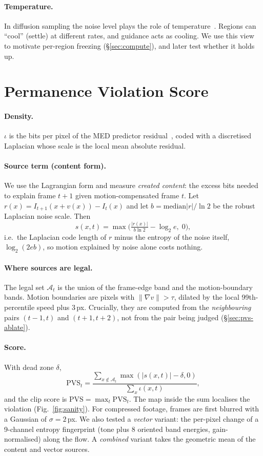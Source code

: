 \documentclass[10pt,twocolumn,letterpaper]{article}
\newcommand{\pvs}{\mathrm{PVS}}
\begin{document}
\paragraph{Temperature.} In diffusion sampling the noise level plays the role of temperature~\cite{sohl2015deep}. Regions can ``cool'' (settle) at different rates, and guidance acts as cooling. We use this view to motivate per-region freezing (\S\ref{sec:compute}), and later test whether it holds up.

\section{Permanence Violation Score}\label{sec:pvs}
\paragraph{Density.} $\iota$ is the bits per pixel of the MED predictor residual~\cite{weinberger2000loco}, coded with a discretised Laplacian whose scale is the local mean absolute residual.
\paragraph{Source term (content form).} We use the Lagrangian form and measure \emph{created content}: the excess bits needed to explain frame $t{+}1$ given motion-compensated frame $t$. Let $r(x)=I_{t+1}(x+v(x))-I_t(x)$ and let $b=\mathrm{median}|r|/\ln 2$ be the robust Laplacian noise scale. Then
\begin{equation}
s(x,t)=\max\!\Big(\tfrac{|r(x)|}{b\ln 2}-\log_2 e,\;0\Big),
\end{equation}
i.e.\ the Laplacian code length of $r$ minus the entropy of the noise itself, $\log_2(2eb)$,
so motion explained by noise alone costs nothing.
\paragraph{Where sources are legal.} The legal set $\mathcal{A}_t$ is the union of the frame-edge band and the motion-boundary bands. Motion boundaries are pixels with $\|\nabla v\|>\tau$, dilated by the local 99th-percentile speed plus 3\,px. Crucially, they are computed from the \emph{neighbouring} pairs $(t{-}1,t)$ and $(t{+}1,t{+}2)$, not from the pair being judged (\S\ref{sec:pvs-ablate}).
\paragraph{Score.} With dead zone $\delta$,
\begin{equation}
\pvs_t=\frac{\sum_{x\notin\mathcal{A}_t}\max(|s(x,t)|-\delta,0)}{\sum_x \iota(x,t)},
\end{equation}
and the clip score is $\pvs=\max_t \pvs_t$.
The map inside the sum localises the violation (Fig.~\ref{fig:sanity}). For compressed footage, frames are first blurred with a Gaussian of $\sigma{=}2$\,px. We also tested a \emph{vector} variant: the per-pixel change of a 9-channel entropy fingerprint (tone plus 8 oriented band energies, gain-normalised) along the flow. A \emph{combined} variant takes the geometric mean of the content and vector sources.
\end{document}
